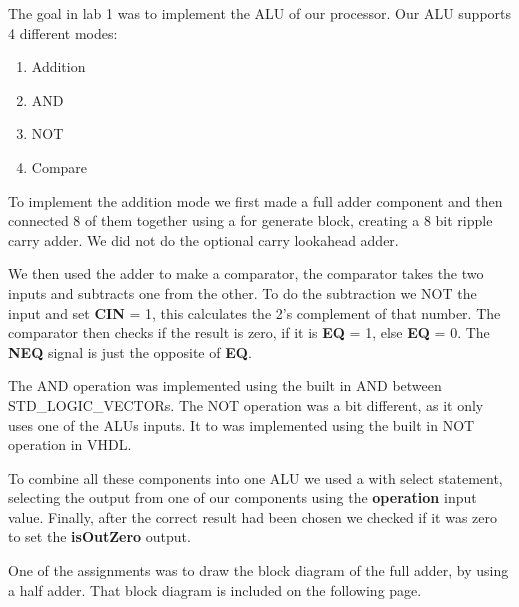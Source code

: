 The goal in lab 1 was to implement the ALU of our processor. Our ALU supports 4
different modes:
\begin{enumerate}
    \item Addition
    \item AND
    \item NOT
    \item Compare
\end{enumerate}
To implement the addition mode we first made a full adder component and then
connected 8 of them together using a for generate block, creating a 8 bit ripple
carry adder. We did not do the optional carry lookahead adder.

We then used the adder to make a comparator, the comparator takes the two inputs
and subtracts one from the other. To do the subtraction we NOT the input and set
\textbf{CIN} = 1, this calculates the 2's complement of that number. The 
comparator then checks if the result is zero, if it is \textbf{EQ} = 1, else 
\textbf{EQ} = 0. The \textbf{NEQ} signal is just the opposite of \textbf{EQ}.

The AND operation was implemented using the built in AND between
STD\_LOGIC\_VECTORs. The NOT operation was a bit different, as it only uses one
of the ALUs inputs. It to was implemented using the built in NOT operation in
VHDL.

To combine all these components into one ALU we used a with select statement,
selecting the output from one of our components using the \textbf{operation}
input value. Finally, after the correct result had been chosen we checked if it
was zero to set the \textbf{isOutZero} output.

One of the assignments was to draw the block diagram of the full adder, by using
a half adder. That block diagram is included on the following page.

